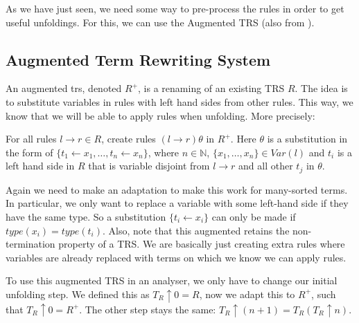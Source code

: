 As we have just seen, we need some way to pre-process the rules in order to get useful unfoldings. For this, we can use the Augmented TRS (also from \cite{Payet:Unfolding}).  

\subsection*{Augmented Term Rewriting System}
An augmented trs, denoted $R^+$, is a renaming of an existing TRS $R$. The idea is to substitute variables in rules with left hand sides from other rules. This way, we know that we will be able to apply rules when unfolding. More precisely:
\begin{definition}
For all rules $l \rightarrow r \in R$, create rules $(l \rightarrow r)\theta$ in $R^+$. Here $\theta$ is a substitution in the form of $\{ t_1 \leftarrow x_1, \dots, t_n \leftarrow x_n \}$, where $n \in \mathbb{N}$, $\{ x_1, \dots, x_n \} \in \textit{Var}(l)$ and $t_i$ is a left hand side in $R$ that is variable disjoint from $l \rightarrow r$ and all other $t_j$ in $\theta$. 
\end{definition}

Again we need to make an adaptation to make this work for many-sorted terms. In particular, we only want to replace a variable with some left-hand side if they have the same type. So a substitution $\{ t_i \leftarrow x_i \}$ can only be made if $\textit{type}(x_i) = \textit{type}(t_i)$. Also, note that this augmented retains the non-termination property of a TRS. We are basically just creating extra rules where variables are already replaced with terms on which we know we can apply rules.  

To use this augmented TRS in an analyser, we only have to change our initial unfolding step. We defined this as $T_R \uparrow 0 = R$, now we adapt this to $R^+$, such that $T_R \uparrow 0 = R^+$. The other step stays the same: $T_R \uparrow (n + 1) = T_R(T_R \uparrow n)$. 

